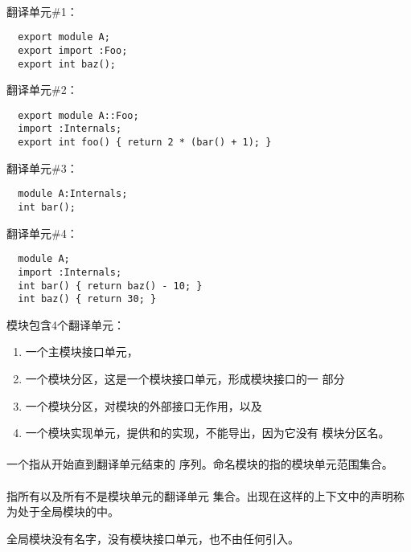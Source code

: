 \paragraph{} %
\begin{example}

  翻译单元\#1：
  \begin{lstlisting}
  export module A;
  export import :Foo;
  export int baz();
  \end{lstlisting}
  翻译单元\#2：
  \begin{lstlisting}
  export module A::Foo;
  import :Internals;
  export int foo() { return 2 * (bar() + 1); }
  \end{lstlisting}
  翻译单元\#3：
  \begin{lstlisting}
  module A:Internals;
  int bar();
  \end{lstlisting}
  翻译单元\#4：
  \begin{lstlisting}
  module A;
  import :Internals;
  int bar() { return baz() - 10; }
  int baz() { return 30; }
  \end{lstlisting}
  模块包含4个翻译单元：
  \begin{enumerate}
    \item 一个主模块接口单元，
    \item 一个模块分区，这是一个模块接口单元，形成模块接口的一
      部分
    \item 一个模块分区，对模块的外部接口无作用，以及
    \item 一个模块实现单元，提供和的实现，不能导出，因为它没有
      模块分区名。
  \end{enumerate}
\end{example}

\paragraph{} %
一个指从开始直到翻译单元结束的
序列。命名模块的指的模块单元范围集合。

\paragraph{} %
指所有以及所有不是模块单元的翻译单元
集合。出现在这样的上下文中的声明称为处于全局模块的中。

\begin{note}
  全局模块没有名字，没有模块接口单元，也不由任何引入。
\end{note}


